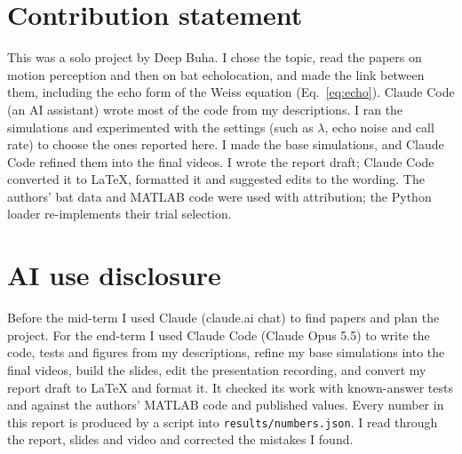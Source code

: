 \documentclass[11pt]{article}
\begin{document}



\section*{Contribution statement}
This was a solo project by Deep Buha. I chose the topic, read the papers on motion perception and then on bat echolocation, and made the link between them, including the echo form of the Weiss equation (Eq.~\ref{eq:echo}). Claude Code (an AI assistant) wrote most of the code from my descriptions. I ran the simulations and experimented with the settings (such as $\lambda$, echo noise and call rate) to choose the ones reported here. I made the base simulations, and Claude Code refined them into the final videos. I wrote the report draft; Claude Code converted it to LaTeX, formatted it and suggested edits to the wording. The authors' bat data and MATLAB code \cite{sallesrepo} were used with attribution; the Python loader re-implements their trial selection.

\section*{AI use disclosure}
Before the mid-term I used Claude (claude.ai chat) to find papers and plan the project. For the end-term I used Claude Code (Claude Opus 5.5) to write the code, tests and figures from my descriptions, refine my base simulations into the final videos, build the slides, edit the presentation recording, and convert my report draft to LaTeX and format it. It checked its work with known-answer tests and against the authors' MATLAB code and published values. Every number in this report is produced by a script into \texttt{results/numbers.json}. I read through the report, slides and video and corrected the mistakes I found.
\end{document}
